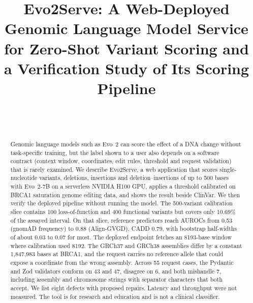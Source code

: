 \documentclass[10pt,journal,a4paper]{IEEEtran}
\begin{document}
\title{Evo2Serve: A Web-Deployed Genomic Language Model Service for Zero-Shot Variant Scoring and a Verification Study of Its Scoring Pipeline}

\author{\\
\\
}

\maketitle

\begin{abstract}
Genomic language models such as Evo~2 can score the effect of a DNA change without task-specific training, but the label shown to a user also depends on a software contract (context window, coordinates, edit rules, threshold and request validation) that is rarely examined. We describe Evo2Serve, a web application that scores single-nucleotide variants, deletions, insertions and deletion--insertions of up to 500 bases with Evo~2-7B on a serverless NVIDIA H100 GPU, applies a threshold calibrated on BRCA1 saturation genome editing data, and shows the result beside ClinVar. We then verify the deployed pipeline without running the model. The 500-variant calibration slice contains 100 loss-of-function and 400 functional variants but covers only 10.69\% of the assayed interval. On that slice, reference predictors reach AUROCs from 0.53 (gnomAD frequency) to 0.88 (Align-GVGD), CADD 0.79, with bootstrap half-widths of about 0.03 to 0.07 for most. The deployed endpoint fetches an 8193-base window where calibration used 8192. The GRCh37 and GRCh38 assemblies differ by a constant 1{,}847{,}983 bases at BRCA1, and the request carries no reference allele that could expose a coordinate from the wrong assembly. Across 55 request cases, the Pydantic and Zod validators conform on 43 and 47, disagree on 6, and both mishandle 7, including assembly and chromosome strings with separator characters that both accept. We list eight defects with proposed repairs. Latency and throughput were not measured. The tool is for research and education and is not a clinical classifier.
\end{abstract}
\end{document}
